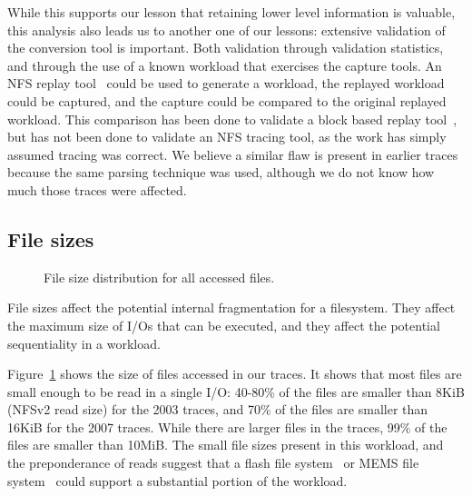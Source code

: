 While this supports our lesson that retaining lower level information
is valuable, this analysis also leads us to another one of our lessons:
extensive validation of the conversion tool is important.  Both
validation through validation statistics, and through the use of a
known workload that exercises the capture tools.  An NFS replay
tool~\cite{NingningFast05} could be used to generate a workload, the
replayed workload could be captured, and the capture could be compared
to the original replayed workload.  This comparison has been done to
validate a block based replay tool~\cite{AndersonFast04}, but has not
been done to validate an NFS tracing tool, as the work has simply assumed
tracing was correct.
We believe a similar
flaw is present in earlier traces~\cite{ellardTraces} because the same
parsing technique was used, although we do not know how much those traces were
affected.

\subsection{File sizes}

\begin{figure}
\vspace{-0.2in}
\caption{File size distribution for all accessed files.}
\label{fig:file-size}
\end{figure}

File sizes affect the potential internal fragmentation for a
filesystem.  They affect the maximum size of I/Os that can be
executed, and they affect the potential sequentiality in a workload.

Figure~\ref{fig:file-size} shows the size of files accessed in our
traces.  It shows that most files are small enough to be read in a single I/O: 
40-80\% of the files are smaller than 8KiB (NFSv2 read size) 
for the 2003 traces, and  70\% of the
files are smaller than 16KiB for the 2007 traces.
While there are larger files in the traces, 99\% of
the files are smaller than 10MiB.  The small file sizes present in this
workload, and the preponderance of reads suggest that a flash file
system~\cite{Kawaguchi95aflash-memory} or MEMS file
system~\cite{SchlosserFast04} could support a substantial portion of
the workload.

